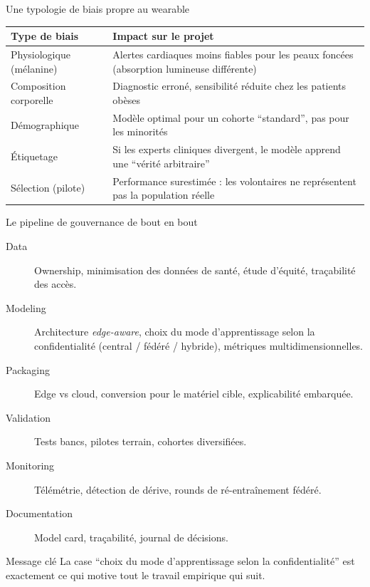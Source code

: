 \documentclass[aspectratio=169,11pt]{beamer}
\begin{document}
\begin{frame}{Une typologie de biais propre au wearable}
  \centering
  \small
  \begin{tabular}{lp{5.2cm}}
    \toprule
    Type de biais & Impact sur le projet \\
    \midrule
    Physiologique (mélanine) & Alertes cardiaques moins fiables pour les
      peaux foncées (absorption lumineuse différente) \\
    Composition corporelle & Diagnostic erroné, sensibilité réduite chez
      les patients obèses \\
    Démographique & Modèle optimal pour un cohorte ``standard'', pas pour
      les minorités \\
    Étiquetage & Si les experts cliniques divergent, le modèle apprend une
      ``vérité arbitraire'' \\
    Sélection (pilote) & Performance surestimée : les volontaires ne
      représentent pas la population réelle \\
    \bottomrule
  \end{tabular}
\end{frame}

\begin{frame}{Le pipeline de gouvernance de bout en bout}
  \small
  \begin{description}
    \item[Data] Ownership, minimisation des données de santé, étude
      d'équité, traçabilité des accès.
    \item[Modeling] Architecture \emph{edge-aware}, choix du mode
      d'apprentissage selon la confidentialité (central / fédéré / hybride),
      métriques multidimensionnelles.
    \item[Packaging] Edge vs cloud, conversion pour le matériel cible,
      explicabilité embarquée.
    \item[Validation] Tests bancs, pilotes terrain, cohortes diversifiées.
    \item[Monitoring] Télémétrie, détection de dérive, rounds de
      ré-entraînement fédéré.
    \item[Documentation] Model card, traçabilité, journal de décisions.
  \end{description}
  \vspace{0.5em}
  \begin{block}{Message clé}
    \small La case ``choix du mode d'apprentissage selon la confidentialité''
    est exactement ce qui motive tout le travail empirique qui suit.
  \end{block}
\end{frame}
\end{document}
